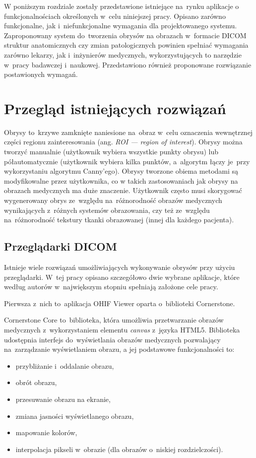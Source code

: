 \documentclass[a4paper,11pt,twoside,openright]{report}
\theoremstyle{definition}
\begin{document}
W poniższym rozdziale zostały przedstawione istniejące na~rynku aplikacje o
funkcjonalnościach określonych w~celu niniejszej pracy. Opisano zarówno funkcjonalne, jak i~niefunkcjonalne
wymagania dla projektowanego systemu. Zaproponowany system do~tworzenia obrysów
na obrazach w~formacie DICOM struktur anatomicznych czy zmian patologicznych
powinien spełniać wymagania zarówno lekarzy, jak i~inżynierów medycznych, wykorzystujących
to narzędzie w~pracy badawczej i~naukowej. Przedstawiono również proponowane rozwiązanie
postawionych wymagań.

\section {Przegląd istniejących rozwiązań}

Obrysy to~krzywe zamknięte naniesione na~obraz w~celu oznaczenia wewnętrznej części
regionu zainteresowania (ang. \textit{ROI --- region of interest}).
Obrysy można tworzyć manualnie (użytkownik wybiera wszystkie punkty obrysu) lub
półautomatycznie (użytkownik wybiera kilka punktów, a~algorytm łączy je~przy wykorzystaniu
algorytmu Canny'ego). Obrysy tworzone obiema metodami są modyfikowalne przez użytkownika,
co w takich zastosowaniach jak obrysy na obrazach medycznych ma duże znaczenie. Użytkownik często musi skorygować
wygenerowany obrys ze~względu na~różnorodność obrazów medycznych wynikających z~różnych systemów
obrazowania, czy też ze~względu na~różnorodność tekstury tkanki obrazowanej (innej dla każdego pacjenta).

\subsection {Przeglądarki DICOM}

Istnieje wiele rozwiązań umożliwiających wykonywanie obrysów przy użyciu przeglądarki.
W~tej pracy opisano szczegółowo dwie wybrane aplikacje, które według autorów w~największym
stopniu spełniają założone cele pracy.

Pierwsza z~nich to~aplikacja OHIF Viewer \cite{OHIF Viewer} oparta o~biblioteki Cornerstone.

Cornerstone Core \cite{Cornerstone Core} to~biblioteka, która umożliwia przetwarzanie
obrazów medycznych z~wykorzystaniem elementu \textit{canvas} z~języka HTML5. Biblioteka
udostępnia interfejs do~wyświetlania obrazów medycznych pozwalający na~zarządzanie
wyświetlaniem obrazu, a jej podstawowe funkcjonalności to:

\begin{itemize}[noitemsep]
\item przybliżanie i~oddalanie obrazu,
\item obrót obrazu,
\item przesuwanie obrazu na ekranie,
\item zmiana jasności wyświetlanego obrazu,
\item mapowanie kolorów,
\item interpolacja pikseli w~obrazie (dla obrazów o~niskiej rozdzielczości).
\end{itemize}
\end{document}
